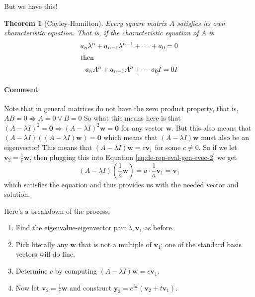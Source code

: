 \documentclass[letterpaper, 11pt, openany]{book}
\theoremstyle{mytheoremstyle}
\newtheorem{theorem}{Theorem}[section]
\theoremstyle{myexamplestyle}
\newenvironment{commentary}{\paragraph{\sffamily \smaller \fontseries{b}\selectfont Comment}}{}
\begin{document}
But we have this!
\begin{theorem}[Cayley-Hamilton]\label{t:Cayley-Hamilton}
    Every square matrix \(A\) satisfies its own characteristic equation. That is, if the characteristic equation of \(A\) is
    \begin{align*}
        a_{n} \lambda^{n} + a_{n-1}\lambda^{n-1} + \cdots + a_{0} = 0\\
        \intertext{then}
        a_{n}A^{n} + a_{n-1} A^{n} + \cdots a_{0}I = 0I
    \end{align*}
\end{theorem}
\begin{commentary}
    Note that in general matrices do not have the zero product property, that is, \(AB = 0 \nRightarrow A = 0 \vee B = 0\)
\end{commentary}
So what this means here is that \((A - \lambda I)^{2} = \mathbf{0} \Rightarrow (A - \lambda I)^{2} \mathbf{w} = \mathbf{0}\) for any vector \(\mathbf{w}\). But this also means that \((A - \lambda I)\left((A - \lambda I) \mathbf{w}\right) = \mathbf{0}\) which means that \((A - \lambda I)\mathbf{w}\) must also be an eigenvector! This means that \((A - \lambda I)\mathbf{w} = c \mathbf{v}_{1}\) for some \(c \neq 0\). So if we let \(\mathbf{v}_{2} = \frac{1}{c}\mathbf{w}\), then plugging this into Equation \ref{eq:de-rep-eval-gen-evec-2} we get
\[(A - \lambda I) \left(\dfrac{1}{a}\mathbf{w}\right) = a \cdot \frac{1}{a} \mathbf{v}_{1}= \mathbf{v}_{1}\]
which satisfies the equation and thus provides us with the needed vector and solution.

Here's a breakdown of the process:
\begin{enumerate}
    \item Find the eigenvalue-eigenvector pair \(\lambda, \mathbf{v}_{1}\) as before.
    \item Pick literally any \(\mathbf{w}\) that is not a multiple of \(\mathbf{v}_{1}\); one of the standard basis vectors will do fine.
    \item Determine \(c\) by computing \((A - \lambda I)\mathbf{w} = c \mathbf{v}_{1}\).
    \item Now let \(\mathbf{v}_{2} = \frac{1}{c} \mathbf{w}\) and construct \(\mathbf{y}_{2} = e^{\lambda t}\left(\mathbf{v}_{2} + t\mathbf{v}_{1}\right)\).
\end{enumerate}
\end{document}
